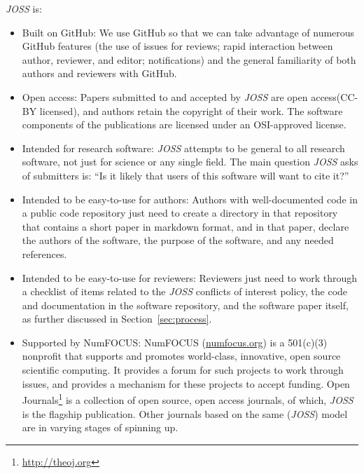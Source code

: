 \documentclass{article}
\newcommand\joss{\textit{JOSS}}
\begin{document}
\begin{center}
\vspace{0.1cm}
\noindent{}
\end{center}
\vspace{0.1cm}

\joss{} is:
\begin{itemize}

\item Built on GitHub: We use GitHub so that we can take advantage of numerous GitHub features (the use of issues for reviews; rapid interaction between author, reviewer, and editor; notifications) and the general familiarity of  both authors and reviewers with GitHub.

\item Open access: Papers submitted to and accepted by \joss{} are open access(CC-BY licensed), and authors retain the copyright of their work. The software components of the publications are licensed under an OSI-approved license. 

\item Intended for research software: \joss{} attempts to be general to all research software, not just for science or any single field.  The main question \joss{} asks of submitters is: ``Is it likely that users of this software will want to cite it?''

\item Intended to be easy-to-use for authors: Authors with well-documented code in a public code repository just need to create a directory in that repository that contains a short paper in markdown format, and in that paper, declare the authors of the software, the purpose of the software, and any needed references. 

\item Intended to be easy-to-use for reviewers: Reviewers just need to work through a checklist of items related to the \joss{} conflicts of interest policy, the code and documentation in the software repository, and the software paper itself, as further discussed in Section~\ref{sec:process}.

\item Supported by NumFOCUS: NumFOCUS (\href{https://www.numfocus.org}{numfocus.org}) is a 501(c)(3) nonprofit that supports and promotes world-class, innovative, open source scientific computing. It provides a forum for such projects to work through issues, and provides a mechanism for these projects to accept funding. Open Journals\footnote{\url{http://theoj.org}} is a collection of open source, open access journals, of which, \joss{} is the flagship publication. Other journals based on the same (\joss{}) model are in varying stages of spinning up.


\end{itemize}
\end{document}

